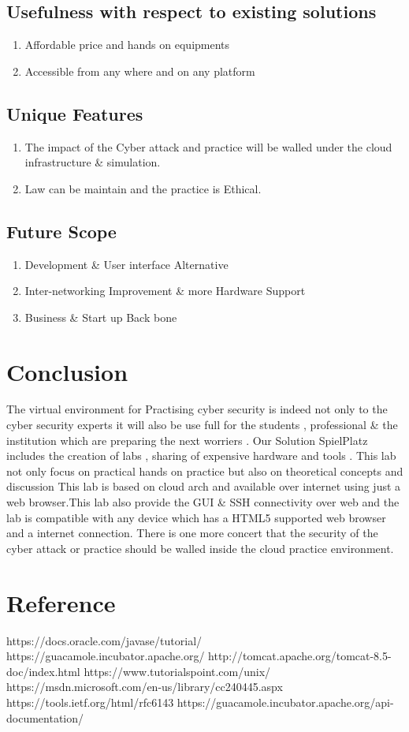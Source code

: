 \documentclass[12pt,a4paper,final,oneside]{report}
\begin{document}
\section{Usefulness with respect to existing solutions }
\begin{enumerate}
\item Affordable price and hands on equipments 
\item Accessible from any where and on any platform
\end{enumerate}
\section{Unique Features}
\begin{enumerate}
\item The impact of the Cyber attack and practice will be walled under the cloud infrastructure \& simulation.
\item Law can be maintain and the practice is Ethical.
\end{enumerate}
\section{Future Scope}
\begin{enumerate}
\item Development \& User interface Alternative
\item Inter-networking Improvement \& more Hardware Support
\item Business \& Start up Back bone
\end{enumerate}
\chapter{Conclusion}
The virtual environment for Practising cyber security is indeed not only to the cyber security experts it will also be use full for the students , professional \& the institution which are preparing the next worriers . Our Solution SpielPlatz 	includes the creation of labs , sharing of  expensive hardware and tools . This lab not only focus on practical hands on practice but also on theoretical concepts and  discussion  This lab is based on cloud arch and available over 	internet using just a web browser.This lab also provide the GUI \& SSH 	connectivity over web and the lab is compatible with any device which has a HTML5 supported web browser and a internet connection. There is one more concert that the security of the cyber attack or practice should be walled inside the cloud practice environment.
\chapter{Reference}
https://docs.oracle.com/javase/tutorial/
https://guacamole.incubator.apache.org/
http://tomcat.apache.org/tomcat-8.5-doc/index.html
https://www.tutorialspoint.com/unix/
https://msdn.microsoft.com/en-us/library/cc240445.aspx
https://tools.ietf.org/html/rfc6143
https://guacamole.incubator.apache.org/api-documentation/
\end{document}

